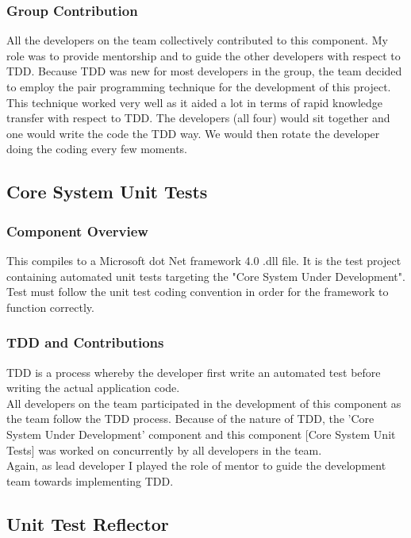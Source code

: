 \documentclass[a4paper,12pt]{article}
\begin{document}
\subsubsection{Group Contribution}
All the developers on the team collectively contributed to this component. My role was to provide mentorship and to guide the other developers with respect to TDD. Because TDD was new for most developers in the group, the team decided to employ the pair programming\cite{pairprogramming} technique for the development of this project. This technique worked very well as it aided a lot in terms of rapid knowledge transfer with respect to TDD. The developers (all four) would sit together and one would write the code the TDD way. We would then rotate the developer doing the coding every few moments.

\subsection{Core System Unit Tests}
\subsubsection{Component Overview}
This compiles to a Microsoft dot Net framework 4.0\cite{dotNetFramework} .dll file. It is the test project containing automated unit tests targeting the "Core System Under Development". Test must follow the unit test coding convention\cite{codeconvention} in order for the framework to function correctly.
\subsubsection{TDD and Contributions}
TDD is a process whereby the developer first write an automated test before writing the actual application code. \\
\linebreak
All developers on the team participated in the development of this component as the team follow the TDD process. Because of the nature of TDD, the 'Core System Under Development' component and this component [Core System Unit Tests] was worked on concurrently by all developers in the team.\\
\linebreak
Again, as lead developer I played the role of mentor to guide the development team towards implementing TDD. 

\subsection{Unit Test Reflector} 
\end{document}
